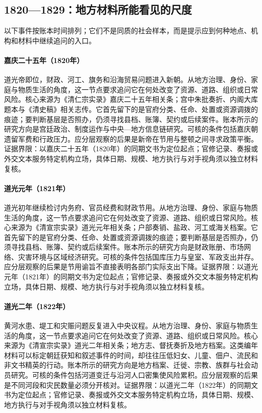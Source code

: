 \subsection{1820—1829：地方材料所能看见的尺度}
以下事件按账本时间排列；它们不是同质的社会样本，而是提示应到何种地点、机构和材料中继续追问的入口。
\hypertarget{social:EQ-1820-DAO-GUANG-ACCESSION}{}\paragraph{嘉庆二十五年（1820年）}道光帝即位，财政、河工、旗务和沿海贸易问题进入新朝。从地方治理、身份、家庭与物质生活的角度，这一节点要求追问它在何处改变了资源、道路、组织或日常风险。核心来源为《清仁宗实录》嘉庆二十五年相关条；宫中朱批奏折、内阁大库题本与《清史稿》相关志传。它首先留下的是官府分类、任命、处置或资源调拨的痕迹；要判断基层是否照办，仍须寻找县档、账簿、契约或后续案件。账本所示的研究方向是宫廷政治、制度运作与中央—地方信息链研究。可核的条件包括嘉庆朝遗留军费和行政压力。应分层观察的后果是新帝在节用与整顿之间寻求政策平衡。证据界限：以嘉庆二十五年（1820年）的同期文书为定位起点；官修记录、奏报或外交文本服务特定机构立场，具体日期、规模、地方执行与对手视角须以独立材料复核。
\hypertarget{social:EQ-1821-IMPERIAL-ECONOMY}{}\paragraph{道光元年（1821年）}道光初年继续检讨内务府、官员经费和财政节用。从地方治理、身份、家庭与物质生活的角度，这一节点要求追问它在何处改变了资源、道路、组织或日常风险。核心来源为《清宣宗实录》道光元年相关条；户部奏销、盐政、河工或海关档案。它首先留下的是官府分类、任命、处置或资源调拨的痕迹；要判断基层是否照办，仍须寻找县档、账簿、契约或后续案件。账本所示的研究方向是财政账册、市场网络、灾害环境与区域经济研究。可核的条件包括国库压力与皇室、军政支出并存。应分层观察的后果是节用谕旨不直接表明各部门实际支出下降。证据界限：以道光元年（1821年）的同期文书为定位起点；官修记录、奏报或外交文本服务特定机构立场，具体日期、规模、地方执行与对手视角须以独立材料复核。
\hypertarget{social:EQ-1822-YELLOW-RIVER-FLOOD}{}\paragraph{道光二年（1822年）}黄河水患、堤工和灾赈问题反复进入中央议程。从地方治理、身份、家庭与物质生活的角度，这一节点要求追问它在何处改变了资源、道路、组织或日常风险。核心来源为《清宣宗实录》道光二年相关条；地方志、督抚奏折及地方档案。这类编年材料可以标定朝廷获知和叙述事件的时间，却往往压低妇女、儿童、佃户、流民和非文书精英的行动。账本所示的研究方向是地方档案、迁徙、宗教、族群与社会动员研究。可核的条件包括河道变迁与沿河人口密集使风险累积。应分层观察的后果是不同河段和灾民数量必须分开核对。证据界限：以道光二年（1822年）的同期文书为定位起点；官修记录、奏报或外交文本服务特定机构立场，具体日期、规模、地方执行与对手视角须以独立材料复核。
